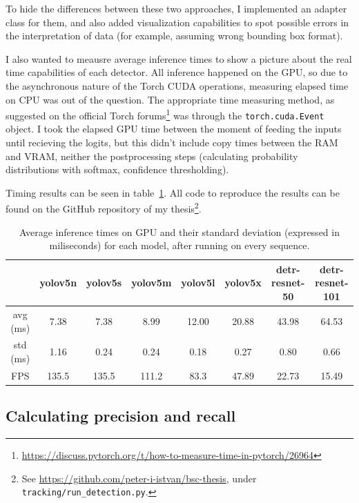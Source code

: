 To hide the differences between these two approaches, I implemented an adapter class for them, and also added visualization capabilities to spot possible errors in the interpretation of data (for example, assuming wrong bounding box format).

I also wanted to meausre average inference times to show a picture about the real time capabilities of each detector. All inference happened on the GPU, so due to the asynchronous nature of the Torch CUDA operations, measuring elapsed time on CPU was out of the question. The appropriate time measuring method, as suggested on the official Torch forums\footnote{\url{https://discuss.pytorch.org/t/how-to-measure-time-in-pytorch/26964}} was through the \verb|torch.cuda.Event| object. I took the elapsed GPU time between the moment of feeding the inputs until recieving the logits, but this didn't include copy times between the RAM and VRAM, neither the postprocessing steps (calculating probability distributions with softmax, confidence thresholding).

Timing results can be seen in table~\ref{tab:inference-times}. All code to reproduce the results can be found on the GitHub repository of my thesis\footnote{
    See \url{https://github.com/peter-i-istvan/bsc-thesis}, under \texttt{tracking/run\_detection.py}.
}.

\begin{table}[h]
    \begin{tabular}{|c|c|c|c|c|c|c|c|}
        \hline
         & yolov5n & yolov5s & yolov5m & yolov5l & yolov5x & detr-resnet-50 & detr-resnet-101 \\
        \hline
        \hline
        avg (ms) & 7.38 & 7.38 & 8.99 & 12.00 & 20.88 & 43.98 & 64.53 \\
        \hline
        std (ms) & 1.16 & 0.24 & 0.24 & 0.18 & 0.27 & 0.80 & 0.66 \\
        \hline
        \hline
            FPS & 135.5 & 135.5 & 111.2 & 83.3 & 47.89 & 22.73 & 15.49 \\
        \hline
    \end{tabular}
    \caption{Average inference times on GPU and their standard deviation (expressed in miliseconds) for each model, after running on every sequence.}
    \label{tab:inference-times}
\end{table}

\subsection{Calculating precision and recall}

